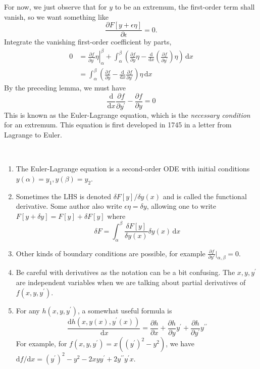 \documentclass[a4paper]{article}
\begin{document}
For now, we just observe that for $y$ to be an extremum, the first-order term shall vanish, so we want something like 
\[
    \frac{\partial F[y+\epsilon \eta]}{\partial \epsilon} =0.
\]
Integrate the vanishing first-order coefficient by parts,
\begin{align*}
    0&=\left.\frac{\partial f}{\partial y^\prime}\eta\right|_\alpha^\beta+\int_\alpha^\beta\left( \frac{\partial f}{\partial y}\eta-\frac{\mathrm d}{\mathrm dx}\left( \frac{\partial f}{\partial y^\prime} \right)\eta \right)\,\mathrm dx\\
    &=\int_\alpha^\beta\left( \frac{\partial f}{\partial y}-\frac{\mathrm d}{\mathrm dx}\frac{\partial f}{\partial y^\prime} \right)\eta\,\mathrm dx
\end{align*}
By the preceding lemma, we must have
$$\boxed{\frac{\mathrm d}{\mathrm dx}\frac{\partial f}{\partial y^\prime}-\frac{\partial f}{\partial y}=0}$$
This is known as the Euler-Lagrange equation, which is the \textit{necessary condition} for an extremum. This equation is first developed in 1745 in a letter from Lagrange to Euler.
\begin{remark}\ 
    \begin{enumerate}
        \item The Euler-Lagrange equation is a second-order ODE with initial conditions $y(\alpha)=y_1,y(\beta)=y_2$.
        \item Sometimes the LHS is denoted $\delta F[y]/\delta y(x)$ and is called the functional derivative.
        Some author also write $\epsilon\eta=\delta y$, allowing one to write $F[y+\delta y]=F[y]+\delta F[y]$ where
        $$\delta F=\int_\alpha^\beta\frac{\delta F[y]}{\delta y(x)}\delta y(x)\,\mathrm dx$$
        \item Other kinds of boundary conditions are possible, for example $ \frac{\partial f}{\partial y'}\Big|_{\alpha,\beta}=0  $.
        \item Be careful with derivatives as the notation can be a bit confusing.
        The $x,y,y^\prime$ are independent variables when we are talking about partial derivatives of $f(x,y,y^\prime)$.
        \item For any $h(x,y,y^\prime)$, a somewhat useful formula is
        $$\frac{\mathrm dh(x,y(x),y^\prime(x))}{\,\mathrm dx}=\frac{\partial h}{\partial x}+\frac{\partial h}{\partial y}y^\prime+\frac{\partial h}{\partial y^\prime}y^{\prime\prime}$$
        For example, for $f(x,y,y^\prime)=x((y^\prime)^2-y^2)$, we have $\mathrm df/\mathrm dx=(y^\prime)^2-y^2-2xyy^\prime+2y^{\prime\prime}y^\prime x$.
    \end{enumerate}
\end{remark}
\end{document}
